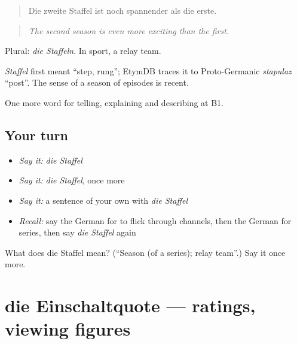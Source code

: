 \begin{quote}
Die zweite Staffel ist noch spannender als die erste.
\end{quote}

\begin{quote}
\emph{The second season is even more exciting than the first.}
\end{quote}

Plural: \emph{die Staffeln}. In sport, a relay team.

\begin{cousinweb}
\emph{Staffel} first meant \textquotedblleft{}step, rung\textquotedblright{}; EtymDB traces it to Proto-Germanic \emph{stapulaz} \textquotedblleft{}post\textquotedblright{}. The sense of a season of episodes is recent.
\end{cousinweb}

\begin{grammarlens}[title={What you've built}]
One more word for telling, explaining and describing at B1.
\end{grammarlens}

\subsection*{Your turn}
\begin{itemize}
\raggedright
  \item \emph{Say it:} \emph{die Staffel}
  \item \emph{Say it:} \emph{die Staffel}, once more
  \item \emph{Say it:} a sentence of your own with \emph{die Staffel}
  \item \emph{Recall:} say the German for to flick through channels, then the German for series, then say \emph{die Staffel} again
\end{itemize}

\begin{tcolorbox}[breakable,colback=teal!4,colframe=teal!35!black,title={Before you move on}]
What does die Staffel mean? (\textquotedblleft{}Season (of a series); relay team\textquotedblright{}.) Say it once more.
\end{tcolorbox}
\section[die Einschaltquote]{die Einschaltquote — ratings, viewing figures}

\label{lesson:GE-C523-einschaltquote}



